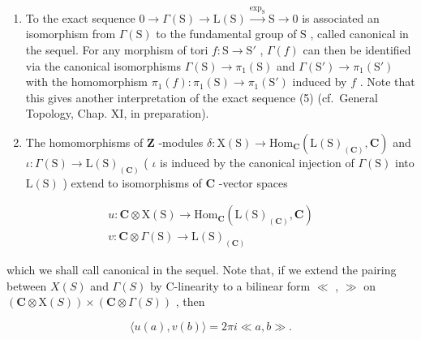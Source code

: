 \begin{enumerate}
\def\labelenumi{\arabic{enumi})}
\setcounter{enumi}{2}
\item
  To the exact sequence \(0 \to \Gamma(\mathrm{S}) \to \mathrm{L}(\mathrm{S}) \xrightarrow{\exp_{\mathrm{S}}} \mathrm{S} \to 0\) is associated an isomorphism from \(\Gamma(\mathrm{S})\) to the fundamental group of \(\mathrm{S}\) , called canonical in the sequel. For any morphism of tori \(f: \mathrm{S} \to \mathrm{S}'\) , \(\Gamma(f)\) can then be identified via the canonical isomorphisms \(\Gamma(\mathrm{S}) \to \pi_1(\mathrm{S})\) and \(\Gamma(\mathrm{S}') \to \pi_1(\mathrm{S}')\) with the homomorphism \(\pi_1(f): \pi_1(\mathrm{S}) \to \pi_1(\mathrm{S}')\) induced by \(f\) . Note that this gives another interpretation of the exact sequence (5) (cf.~General Topology, Chap. XI, in preparation).
\item
  The homomorphisms of \(\mathbf{Z}\) -modules \(\delta : \mathrm{X}(\mathrm{S}) \to \mathrm{Hom}_{\mathbf{C}}(\mathrm{L}(\mathrm{S})_{(\mathbf{C})}, \mathbf{C})\) and \(\iota : \Gamma(\mathrm{S}) \to \mathrm{L}(\mathrm{S})_{(\mathbf{C})}\) ( \(\iota\) is induced by the canonical injection of \(\Gamma(\mathrm{S})\) into \(\mathrm{L}(\mathrm{S})\) ) extend to isomorphisms of \(\mathbf{C}\) -vector spaces
\end{enumerate}

\[
\begin{array}{l} u: \mathbf {C} \otimes \mathrm{X} (\mathrm{S}) \to \mathrm{Hom} _ {\mathbf {C}} (\mathrm{L} (\mathrm{S}) _ {(\mathbf {C})}, \mathbf {C}) \\ v: \mathbf {C} \otimes \Gamma (\mathrm{S}) \to \mathrm{L} (\mathrm{S}) _ {(\mathbf {C})} \end{array}
\]

which we shall call canonical in the sequel. Note that, if we extend the pairing between \(X(S)\) and \(\Gamma(S)\) by C-linearity to a bilinear form \(\ll\) , \(\gg\) on \((\mathbf{C} \otimes \mathrm{X}(S)) \times (\mathbf{C} \otimes \Gamma(S))\) , then

\[
\langle u (a), v (b) \rangle = 2 \pi i \ll a, b \gg .
\]

